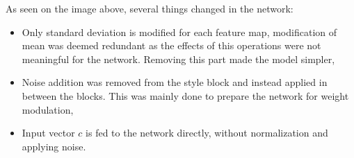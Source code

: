 \documentclass[12pt,a4paper,openany]{book}
\begin{document}
\noindent As seen on the image above, several things changed in the network:

\begin{itemize}
\item Only standard deviation is modified for each feature map, modification of mean was deemed redundant as the effects of this operations were not meaningful for the network. Removing this part made the model simpler,
\item Noise addition was removed from the style block and instead applied in between the blocks. This was mainly done to prepare the network for weight modulation,
\item Input vector $c$ is fed to the network directly, without normalization and applying noise.
\end{itemize}
%
%
%







\end{document}
